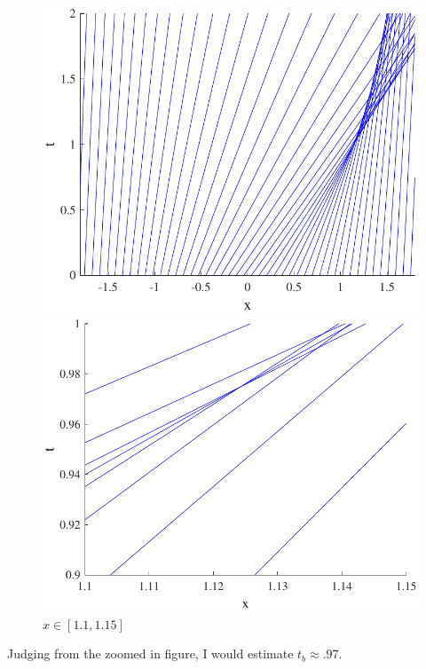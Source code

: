 \documentclass{article}
\begin{document}
\begin{figure}[H]
  \centering
  \begin{minipage}[b]{0.49\textwidth}
    \includegraphics[width=\textwidth]{hw_13_plot8.pdf}
    \caption{$x \in [-1.8, 1.8]$}

  \end{minipage}
  \hfill
  \begin{minipage}[b]{0.49\textwidth}
    \includegraphics[width=\textwidth]{hw_13_plot9.pdf}
    \caption{$x \in [1.1, 1.15]$}

  \end{minipage}
    \hfill
\end{figure}
\begin{tcolorbox}[minipage,colback=white,arc=0pt,outer arc=0pt]
Judging from the zoomed in figure, I would estimate $t_b \approx .97$.
\end{tcolorbox}
\end{document}
